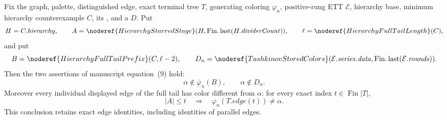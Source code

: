 \begin{lemma}
Fix the graph, palette, distinguished edge, exact terminal tree \(T\),
generating coloring \(\varphi_n\), positive-rung ETT \(\mathcal E\),
hierarchy base, minimum hierarchy counterexample \(C\), its
, and a
 \(D\).  Put
\[
 H=C.\mathit{hierarchy},\qquad
 A=\noderef{HierarchyStarredStage}
      (H,\operatorname{Fin.last}(H.\mathit{dividerCount})),\qquad
 \ell=\noderef{HierarchyFullTailLength}(C),
\]
and put
\[
 B=\noderef{HierarchyFullTailPrefix}(C,\ell-2),\qquad
 D_n=\noderef{TashkinovStoredColors}
   (\mathcal E.\mathit{series}.\mathit{data},
      \operatorname{Fin.last}(\mathcal E.\mathit{rounds})).
\]
Then the two assertions of manuscript equation~(9) hold:
\[
       \alpha\notin\overline\varphi_n(B),
       \qquad \alpha\notin D_n.                         \tag{9}
\]
Moreover every individual displayed edge of the full tail has color
different from \(\alpha\): for every exact index
\(t\in\operatorname{Fin}|T|\),
\[
       |A|\leq t\quad\Longrightarrow\quad
       \varphi_n(T.\mathit{edge}(t))\ne\alpha .          \tag{10}
\]
This conclusion retains exact edge identities, including identities of
parallel edges.
\end{lemma}
